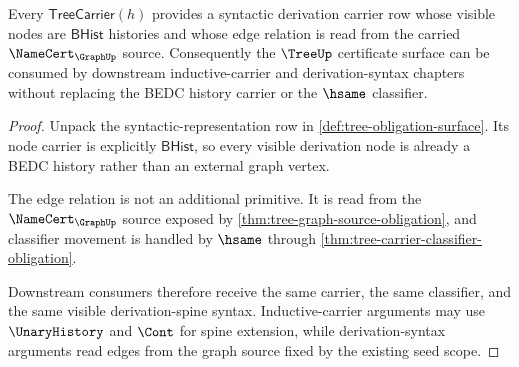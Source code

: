 \begin{theorem}\label{thm:tree-syntactic-representation-obligation}
Every $\mathsf{TreeCarrier}(h)$ provides a syntactic derivation carrier row whose visible nodes are $\mathsf{BHist}$ histories and whose edge relation is read from the carried $\NameCert_{\GraphUp}$ source. Consequently the $\TreeUp$ certificate surface can be consumed by downstream inductive-carrier and derivation-syntax chapters without replacing the BEDC history carrier or the $\hsame$ classifier.
\end{theorem}
\begin{proof}
Unpack the syntactic-representation row in \autoref{def:tree-obligation-surface}. Its node carrier is explicitly $\mathsf{BHist}$, so every visible derivation node is already a BEDC history rather than an external graph vertex.

The edge relation is not an additional primitive. It is read from the $\NameCert_{\GraphUp}$ source exposed by \autoref{thm:tree-graph-source-obligation}, and classifier movement is handled by $\hsame$ through \autoref{thm:tree-carrier-classifier-obligation}.

Downstream consumers therefore receive the same carrier, the same classifier, and the same visible derivation-spine syntax. Inductive-carrier arguments may use $\UnaryHistory$ and $\Cont$ for spine extension, while derivation-syntax arguments read edges from the graph source fixed by the existing seed scope.
\end{proof}

